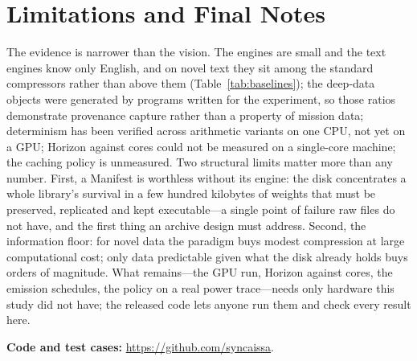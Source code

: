 \documentclass[11pt,a4paper]{article}
\theoremstyle{definition}
\theoremstyle{plain}
\theoremstyle{remark}
\begin{document}
\section{Limitations and Final Notes}
The evidence is narrower than the vision. The engines are small and the text engines know only
English, and on novel text they sit among the standard compressors rather than above them
(Table~\ref{tab:baselines}); the deep-data objects were generated by programs written for the experiment, so those
ratios demonstrate provenance capture rather than a property of mission data; determinism has
been verified across arithmetic variants on one CPU, not yet on a GPU; Horizon against cores could
not be measured on a single-core machine; the caching policy is unmeasured. Two structural limits
matter more than any number. First, a Manifest is worthless without its engine: the disk
concentrates a whole library's survival in a few hundred kilobytes of weights that must be
preserved, replicated and kept executable---a single point of failure raw files do not have, and
the first thing an archive design must address. Second, the information floor: for novel data the
paradigm buys modest compression at large computational cost; only data predictable given what the
disk already holds buys orders of magnitude. What remains---the GPU run, Horizon against cores, the
emission schedules, the policy on a real power trace---needs only hardware this study did not
have; the released code lets anyone run them and check every result here.

\noindent\textbf{Code and test cases:} \url{https://github.com/syncaissa}.

\end{document}
